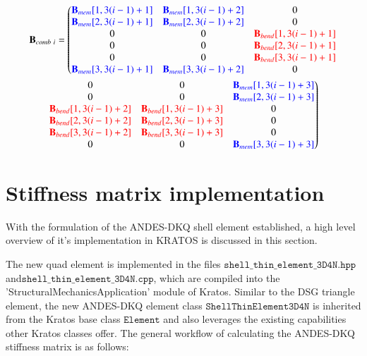 \begin{multline}
	\mathbf{B}_{comb\ i} = \left(
	\begin{matrix}
		\textcolor{blue}{\mathbf{B}_{mem}[1,3(i-1) + 1]} & \textcolor{blue}{\mathbf{B}_{mem}[1,3(i-1) + 2]} & 0 \\ 
		\textcolor{blue}{\mathbf{B}_{mem}[2,3(i-1) + 1]} & \textcolor{blue}{\mathbf{B}_{mem}[2,3(i-1) + 2]} & 0 \\ 
		0 & 0 & \textcolor{red}{\mathbf{B}_{bend}[1,3(i-1) + 1]} \\ 
		0 & 0 & \textcolor{red}{\mathbf{B}_{bend}[2,3(i-1) + 1]} \\
		0 & 0 & \textcolor{red}{\mathbf{B}_{bend}[3,3(i-1) + 1]} \\
		\textcolor{blue}{\mathbf{B}_{mem}[3,3(i-1) + 1]} & \textcolor{blue}{\mathbf{B}_{mem}[3,3(i-1) + 2]} & 0 \\
	\end{matrix}\right.                
	\\
	\left.
	\begin{matrix}
		0 & 0 & \textcolor{blue}{\mathbf{B}_{mem}[1,3(i-1) + 3]} \\ 
		0 & 0 & \textcolor{blue}{\mathbf{B}_{mem}[2,3(i-1) + 3]} \\ 
		\textcolor{red}{\mathbf{B}_{bend}[1,3(i-1) + 2]} & \textcolor{red}{\mathbf{B}_{bend}[1,3(i-1) + 3]} & 0 \\ 
		\textcolor{red}{\mathbf{B}_{bend}[2,3(i-1) + 2]} & \textcolor{red}{\mathbf{B}_{bend}[2,3(i-1) + 3]} & 0 \\
		\textcolor{red}{\mathbf{B}_{bend}[3,3(i-1) + 2]} & \textcolor{red}{\mathbf{B}_{bend}[3,3(i-1) + 3]} & 0 \\
		0 & 0 & \textcolor{blue}{\mathbf{B}_{mem}[3,3(i-1) + 3]} \\
	\end{matrix}\right)
	\label{equation33}
\end{multline}

\section{Stiffness matrix implementation}

With the formulation of the ANDES-DKQ shell element established, a high level overview of it's implementation in KRATOS is discussed in this section.

The new quad element is implemented in the files $\texttt{shell\_thin\_element\_3D4N.hpp}$ and\break$\texttt{shell\_thin\_element\_3D4N.cpp}$, which are compiled into the 'StructuralMechanicsApplication' module of Kratos. Similar to the DSG triangle element, the new ANDES-DKQ element class $\texttt{ShellThinElement3D4N}$ is inherited from the Kratos base class $\texttt{Element}$ and also leverages the existing capabilities other Kratos classes offer. The general workflow of calculating the ANDES-DKQ stiffness matrix is as follows:


